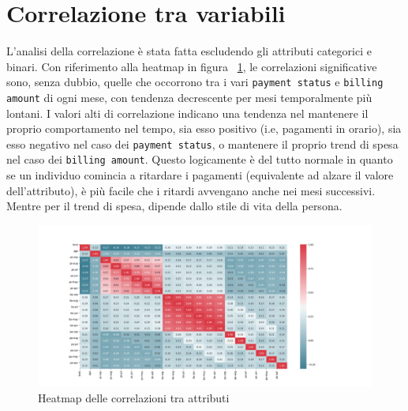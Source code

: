 \section{Correlazione tra variabili}
L'analisi della correlazione \`e stata fatta escludendo
gli attributi categorici e binari. Con riferimento alla 
heatmap in figura ~\ref{heatmap}, le correlazioni significative
sono, senza dubbio, quelle che occorrono tra i vari \texttt{payment status}
e \texttt{billing amount} di ogni mese, con tendenza decrescente per mesi
temporalmente pi\`u lontani. I valori alti di correlazione indicano una
tendenza nel mantenere il proprio comportamento nel tempo, sia esso positivo
(i.e, pagamenti in orario), sia esso
negativo nel caso dei \texttt{payment status}, o mantenere il proprio trend di spesa
nel caso dei \texttt{billing amount}.
Questo logicamente \`e del tutto normale in quanto se un individuo comincia a ritardare
i pagamenti (equivalente ad alzare il valore dell'attributo), \`e pi\`u facile che
i ritardi avvengano anche nei mesi successivi.
Mentre per il trend di spesa, dipende dallo stile di vita della persona.

\begin{figure}[h]
\centering
  \includegraphics[width=.7\linewidth]{img/heatmap.png}
  \caption{Heatmap delle correlazioni tra attributi}
  \label{heatmap}
\end{figure}
